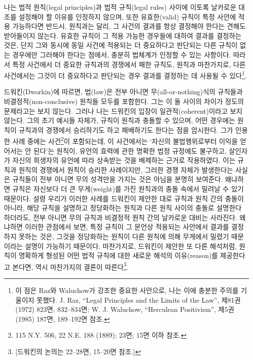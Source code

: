 나는 법적 원칙(legal principles)과 법적 규칙(legal rules) 사이에 이토록
날카로운 대조를 설정해야 할 이유를 인정하지 않으며, 또한 유효한(valid)
규칙이 특정 사안에 적용 가능하다면 반드시, 원칙과는 달리, 그 사건의
결과를 항상 결정해야 한다는 견해도 받아들이지 않는다. 유효한 규칙이 그
적용 가능한 경우들에 대하여 결과를 결정하는 것은, 단지 그와 동시에 동일
사건에 적용되는 더 중요하다고 판단되는 다른 규칙이 없는 경우에만
그러해야 한다는 점에서, 충분히 법체계가 인정할 수 있는 사항이다. 따라서
특정 사건에서 더 중요한 규칙과의 경쟁에서 패한 규칙도, 원칙과
마찬가지로, 다른 사건에서는 그것이 더 중요하다고 판단되는 경우 결과를
결정하는 데 사용될 수 있다\footnote{이 점은 Raz와 Waluchow가 강조한
  중요한 사안으로, 나는 이에 충분한 주의를 기울이지 못했다. J. Raz,
  ``Legal Principles and the Limits of the Law'',  제81권 (1972) 823면, 832--834면; W. J. Waluchow, ``Herculean
  Positivism'',  제5권 (1985)
  187면, 189--192면 참조.}.

드워킨(Dworkin)에 따르면, 법(law)은 전부 아니면 무(all-or-nothing)식의
규칙들과 비결정적(non-conclusive) 원칙들 모두를 포함한다. 그는 이 둘
사이의 차이가 정도의 문제라고는 보지 않는다. 그러나 나는 드워킨의 입장이
일관적(coherent)이라고 보지 않는다. 그의 초기 예시들 자체가, 규칙이
원칙과 충돌할 수 있으며, 어떤 경우에는 원칙이 규칙과의 경쟁에서
승리하기도 하고 패배하기도 한다는 점을 암시한다. 그가 인용한 사례 중에는
 사건\footnote{115 N.Y. 506, 22 N.E. 188 (1889);
   23면;  15면 이하 참조.}이 포함되는데, 이
사건에서는 `자신의 불법행위로부터 이익을 얻어서는 안 된다'는 원칙이,
유언의 효력에 관한 명확한 법정 규정에도 불구하고, 살인자가 자신의
희생자의 유언에 따라 상속받는 것을 배제하는 근거로 작용하였다. 이는
규칙과 원칙의 경쟁에서 원칙이 승리한 사례이지만, 그러한 경쟁 자체가
발생한다는 사실은 규칙들이 전부 아니면 무의 성격만을 가지는 것은 아님을
분명히 보여준다. 왜냐하면 규칙은 자신보다 더 큰 무게(weight)를 가진
원칙과의 충돌 속에서 밀려날 수 있기 때문이다. 설령 우리가 이러한 사례를
드워킨이 제안한 대로 규칙과 원칙 간의 충돌이 아니라, 해당 규칙을
설명하고 정당화하는 원칙과 다른 원칙 사이의 충돌로 설명한다 하더라도,
전부 아니면 무의 규칙과 비결정적 원칙 간의 날카로운 대비는 사라진다.
왜냐하면 이러한 관점에서 보면, 특정 규칙이 그 문언상 적용되는 사안에서
결과를 결정하지 못하는 것은, 그것을 정당화하는 원칙이 다른 원칙에 의해
무게에서 밀렸기 때문이라는 설명이 가능하기 때문이다. 마찬가지로,
드워킨이 제안한 또 다른 해석처럼, 원칙이 명확하게 형성된 어떤 법적
규칙에 대한 새로운 해석의 이유(reason)를 제공한다고 본다면, 역시
마찬가지의 결론이 따른다\footnote{{[}드워킨의 논의는 
  22--28면,  15--20면 참조.{]}}.

